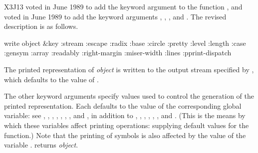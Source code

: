 \begin{newer}
X3J13 voted in June 1989  to add the keyword argument
 to the function , and voted in June 1989 
to add the keyword arguments , , ,
and .
The revised description
is as follows.

\begin{defun}[Function]
write object &key :stream :escape :radix :base :circle
   :pretty :level :length :case :gensym :array :readably
   :right-margin :miser-width :lines :pprint-dispatch

The printed representation of \emph{object} is written to the output stream
specified by , which defaults to the value of .

The other keyword arguments specify values used to control the
generation of the printed representation.  Each defaults to the
value of the corresponding global variable: see ,
, , , ,
, , and , in addition to
,
,
,
,
,
,
and .
(This is the means by which these variables affect printing operations:
supplying default values for the  function.)
Note that the printing of symbols is also affected by the value
of the variable .
 returns \emph{object}.
\end{defun}
\end{newer}

